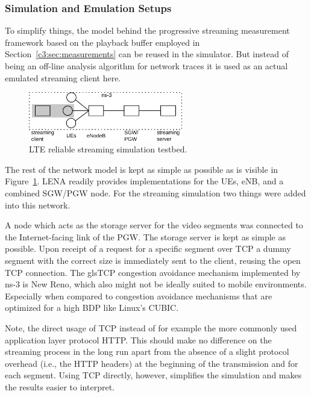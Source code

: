 \subsubsection{Simulation and Emulation Setups}

To simplify things, the model behind the progressive streaming measurement framework based on the playback buffer employed in Section~\ref{c3:sec:measurements} can be reused in the simulator. But instead of being an off-line analysis algorithm for network traces it is used as an actual emulated streaming client here.

\begin{figure}[htb]
	\centering
	\includegraphics[width=0.6\textwidth]{images/streaming-simulation.pdf}
	\caption{\gls{LTE} reliable streaming simulation testbed.}
\label{c6:fig:streaming-simulation}
\end{figure}

The rest of the network model is kept as simple as possible as is visible in Figure~\ref{c6:fig:streaming-simulation}. LENA readily provides implementations for the \glspl{UE}, \gls{eNB}, and a combined \gls{SGW}/\gls{PGW} node. For the streaming simulation two things were added into this network. 

A node which acts as the storage server for the video segments was connected to the Internet-facing link of the \gls{PGW}. The storage server is kept as simple as possible. Upon receipt of a request for a specific segment over \gls{TCP} a dummy segment with the correct size is immediately sent to the client, reusing the open \gls{TCP} connection. %
The gls{TCP} congestion avoidance mechanism implemented by ns-3 is New Reno, which also might not be ideally suited to mobile environments. Especially when compared to congestion avoidance mechanisms that are optimized for a high \gls{BDP} like Linux's CUBIC.

Note, the direct usage of \gls{TCP} instead of for example the more commonly used application layer protocol \gls{HTTP}. This should make no difference on the streaming process in the long run apart from the absence of a slight protocol overhead (i.e., the \gls{HTTP} headers) at the beginning of the transmission and for each segment. Using \gls{TCP} directly, however, simplifies the simulation and makes the results easier to interpret.

